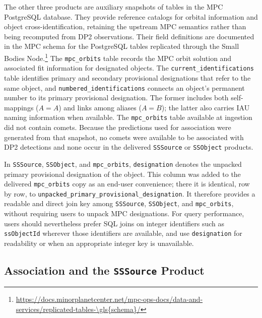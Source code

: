 The other three products are auxiliary snapshots of tables in the \gls{MPC}
PostgreSQL database.  They provide reference catalogs for orbital information
and object cross-identification, retaining the upstream \gls{MPC} semantics rather
than being recomputed from \gls{DP2} observations.  Their field definitions are
documented in the MPC \gls{schema} for the PostgreSQL tables replicated through the
Small Bodies Node.\footnote{\url{https://docs.minorplanetcenter.net/mpc-ops-docs/data-and-services/replicated-tables-\gls{schema}/}}
The \texttt{mpc\_orbits} table records the \gls{MPC} orbit solution and associated
fit information for designated objects.  The
\texttt{current\_identifications} table identifies primary and secondary
provisional designations that refer to the same object, and
\texttt{numbered\_identifications} connects an object's permanent number to
its primary provisional designation.  The former includes both self-mappings
($A=A$) and links among aliases ($A=B$); the latter also carries \gls{IAU} naming
information when available.  The \texttt{mpc\_orbits} table available at
ingestion did not contain comets.
Because the predictions used for association were generated from that
snapshot, no comets were available to be associated with \gls{DP2} detections and
none occur in the delivered \texttt{SSSource} or \texttt{SSObject} products.

In \texttt{SSSource}, \texttt{SSObject}, and \texttt{mpc\_orbits},
\texttt{designation} denotes the unpacked primary provisional designation of
the object.  This column was added to the delivered \texttt{mpc\_orbits} copy
as an end-user convenience; there it is identical, row by row, to
\texttt{unpacked\_primary\_provisional\_designation}.  It therefore provides
a readable and direct join key among \texttt{SSSource}, \texttt{SSObject},
and \texttt{mpc\_orbits}, without requiring users to unpack \gls{MPC} designations.
For query performance, users should nevertheless prefer \gls{SQL} joins on integer
identifiers such as \texttt{ssObjectId} wherever those identifiers are
available, and use \texttt{designation} for readability or when an
appropriate integer key is unavailable.

\subsection{Association and the \texttt{SSSource} Product}
\label{sec:ss-association}

